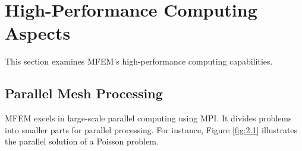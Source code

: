 \section{High-Performance Computing Aspects}
This section examines MFEM's high-performance computing capabilities.

\subsection{Parallel Mesh Processing}
MFEM excels in large-scale parallel computing using MPI. It divides problems into smaller parts for parallel processing. For instance, Figure \ref{fig:2.1} illustrates the parallel solution of a Poisson problem.


